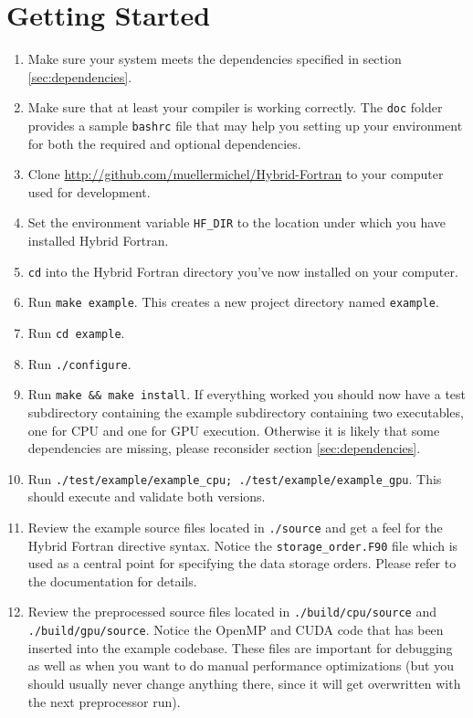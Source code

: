 {\section{Getting Started}
\begin{enumerate}
 \item Make sure your system meets the dependencies specified in section \ref{sec:dependencies}.
 \item Make sure that at least your compiler is working correctly. The \verb|doc| folder provides a sample \verb|bashrc| file that may help you setting up your environment for both the required and optional dependencies.
 \item Clone \url{http://github.com/muellermichel/Hybrid-Fortran} to your computer used for development.
 \item Set the environment variable \verb|HF_DIR| to the location under which you have installed Hybrid Fortran.
 \item \verb|cd| into the Hybrid Fortran directory you've now installed on your computer.
 \item Run \verb|make example|. This creates a new project directory named \verb|example|.
 \item Run \verb|cd example|.
 \item Run \verb|./configure|.
 \item Run \verb|make && make install|. If everything worked you should now have a test subdirectory containing the example subdirectory containing two executables, one for CPU and one for GPU execution. Otherwise it is likely that some dependencies are missing, please reconsider section \ref{sec:dependencies}.
 \item Run \verb|./test/example/example_cpu; ./test/example/example_gpu|. This should execute and validate both versions.
 \item Review the example source files located in \verb|./source| and get a feel for the Hybrid Fortran directive syntax. Notice the \verb|storage_order.F90| file which is used as a central point for specifying the data storage orders. Please refer to the documentation for details.
 \item Review the preprocessed source files located in \verb|./build/cpu/source| and \verb|./build/gpu/source|. Notice the OpenMP and CUDA code that has been inserted into the example codebase. These files are important for debugging as well as when you want to do manual performance optimizations (but you should usually never change anything there, since it will get overwritten with the next preprocessor run).

\end{enumerate}}
